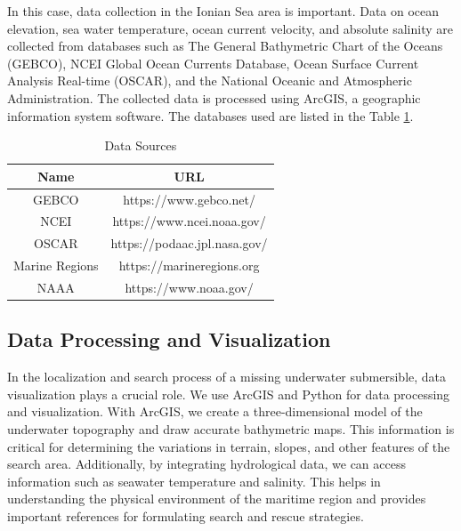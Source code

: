 \documentclass[12pt]{article}
\begin{document}
In this case, data collection in the Ionian Sea area is important. Data on ocean elevation, sea water temperature, ocean current velocity, and absolute salinity are collected from databases such as The General Bathymetric Chart of the Oceans (GEBCO), NCEI Global Ocean Currents Database, Ocean Surface Current Analysis Real-time (OSCAR), and the National Oceanic and Atmospheric Administration. The collected data is processed using ArcGIS, a geographic information system software. The databases used are listed in the Table \ref{tab:data_sources}.


\begin{table}[h!]
    \centering
    \caption{Data Sources}
    \vspace{.4cm}
    \label{tab:data_sources}
    \begin{tabular}{cc}
        \toprule
        Name           & URL                          \\
        \midrule
        GEBCO          & https://www.gebco.net/       \\

        NCEI           & https://www.ncei.noaa.gov/   \\

        OSCAR          & https://podaac.jpl.nasa.gov/ \\

        Marine Regions & https://marineregions.org    \\

        NAAA           & https://www.noaa.gov/        \\
        \bottomrule
    \end{tabular}
\end{table}

\subsection{Data Processing and Visualization}

In the localization and search process of a missing underwater submersible, data visualization plays a crucial role. We use ArcGIS and Python for data processing and visualization. With ArcGIS, we create a three-dimensional model of the underwater topography and draw accurate bathymetric maps. This information is critical for determining the variations in terrain, slopes, and other features of the search area. Additionally, by integrating hydrological data, we can access information such as seawater temperature and salinity. This helps in understanding the physical environment of the maritime region and provides important references for formulating search and rescue strategies.
\end{document}
